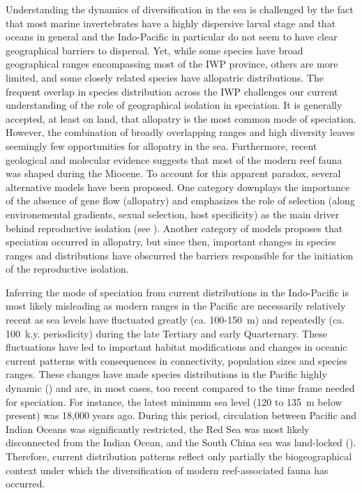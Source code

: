 \documentclass{article}\usepackage[]{graphicx}\usepackage[]{color}
\begin{document}
Understanding the dynamics of diversification in the sea is challenged by the
fact that most marine invertebrates have a highly dispersive larval stage and
that oceans in general and the Indo-Pacific in particular do not seem to have
clear geographical barriers to dispersal. Yet, while some species have broad
geographical ranges encompassing most of the IWP province, others are more
limited, and some closely related species have allopatric distributions. The
frequent overlap in species distribution across the IWP challenges our current
understanding of the role of geographical isolation in speciation. It is
generally accepted, at least on land, that allopatry is the most common mode of
speciation. However, the combination of broadly overlapping ranges and high
diversity leaves seemingly few opportunities for allopatry in the
sea. Furthermore, recent geological and molecular evidence suggests that most of
the modern reef fauna was shaped during the Miocene. To account for this
apparent paradox, several alternative models have been proposed. One category
downplays the importance of the absence of gene flow (allopatry) and emphasizes
the role of selection (along environemental gradients, sexual selection, host
specificity) as the main driver behind reproductive isolation (see
\cite{Bowen2013}). Another category of models proposes that speciation occurred
in allopatry, but since then, important changes in species ranges and
distributions have obscurred the barriers responsible for the initiation of the
reproductive isolation.

Inferring the mode of speciation from current distributions in the Indo-Pacific
is most likely misleading as modern ranges in the Pacific are necessarily
relatively recent as sea levels have fluctuated greatly (ca. 100-150~m) and
repeatedly (ca. 100~k.y. periodicity) during the late Tertiary and early
Quarternary. These fluctuations have led to important habitat modifications and
changes in oceanic current patterns with consequences in connectivity,
population sizes and species ranges. These changes have made species
distributions in the Pacific highly dynamic (\cite{Paulay1990}) and are, in most
cases, too recent compared to the time frame needed for speciation. 
For instance, the latest minimum sea level (120 to 135~m below present) was
18,000 years ago. During this period, circulation between Pacific and Indian
Oceans was significantly restricted, the Red Sea was most likely disconnected
from the Indian Ocean, and the South China sea was land-locked
(\cite{Veron1992}). Therefore, current distribution patterns reflect only
partially the biogeographical context under which the diversification of modern
reef-associated fauna has occurred.
\end{document}
